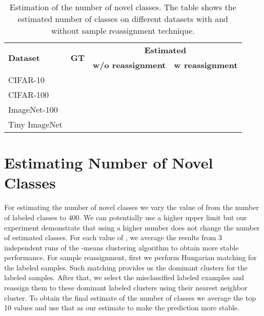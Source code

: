 \documentclass[runningheads]{eccv2022submission}
\begin{document}
\begin{table}
\caption{Estimation of the number of novel classes. The table shows the estimated number of classes on different datasets with and without sample reassignment technique.}
\begin{center}\setlength{\tabcolsep}{4pt}
\small
\begin{tabular}{lccc}
\hline

\multicolumn{1}{l}{\multirow{2}{*}{\textbf{Dataset}}}  & \multicolumn{1}{c}{\multirow{2}{*}{\textbf{GT}}} & \multicolumn{2}{c}{\textbf{Estimated}}\\
\multicolumn{1}{c}{} & \multicolumn{1}{c}{} & \multicolumn{1}{c}{\textbf{w/o reassignment}} & \multicolumn{1}{c}{\textbf{w reassignment}}\\




\hline
CIFAR-10 &  &  & \\
CIFAR-100 &  &  & \\
ImageNet-100 &  &  & \\
Tiny ImageNet &  &  & \\
\hline 



\end{tabular}
\end{center}
\label{tab:estimation}
\vspace{-6mm}
\end{table}


\section{Estimating Number of Novel Classes}
\label{sec:novel_estimate}
For estimating the number of novel classes we vary the value of  from the number of labeled classes to 400. We can potentially use a higher upper limit but our experiment demonstrate that using a higher number does not change the number of estimated classes. For each value of , we average the results from 3 independent runs of the -means clustering algorithm to obtain more stable performance. For sample reassignment, first we perform Hungarian matching \cite{kuhn1955hungarian} for the labeled samples. Such matching provides us the dominant clusters for the labeled samples. After that, we select the misclassified labeled examples and reassign them to these dominant labeled clusters using their nearest neighbor cluster. To obtain the final estimate of the number of classes we average the top 10 values and use that as our estimate to make the prediction more stable.
\end{document}
